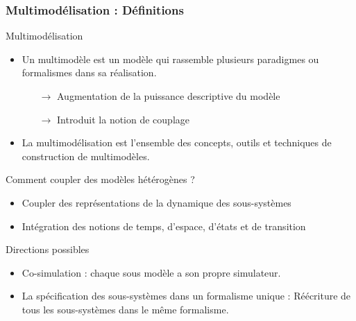 \documentclass[xetex, compress, table, svgnames]{beamer}
\begin{document}
\begin{frame}
  \frametitle{Multimodélisation : Définitions}
  \begin{alertblock}{Multimodélisation}
    \begin{itemize}
    \item Un multimodèle est un modèle qui rassemble plusieurs
      paradigmes ou formalismes dans sa réalisation.
      \begin{itemize}
      \item [$\rightarrow$] Augmentation de la puissance descriptive du modèle
      \item [$\rightarrow$] Introduit la notion de couplage
      \end{itemize}
    \item La multimodélisation est l'ensemble des concepts, outils et
      techniques de construction de multimodèles.
    \end{itemize}
  \end{alertblock}
  \begin{block}{Comment coupler des modèles hétérogènes ?}
    \begin{itemize}
    \item Coupler des représentations de la dynamique des sous-systèmes
    \item Intégration des notions de temps, d’espace, d’états et de transition
    \end{itemize}
  \end{block}
  \pause
  \begin{block}{Directions possibles}
    \begin{itemize}
    \item \alert{Co-simulation} : chaque sous modèle a son propre
      simulateur.
    \item La spécification des sous-systèmes dans un \alert{formalisme
        unique} : Réécriture de tous les sous-systèmes dans le même
      formalisme.
    \end{itemize}
  \end{block}
\end{frame}
\end{document}
